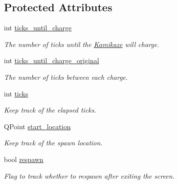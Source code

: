 \subsection*{Protected Attributes}
\begin{DoxyCompactItemize}
\item 
\hypertarget{classKamikaze_a1daf6e11e123fb83099dca5832daf9ce}{
int \hyperlink{classKamikaze_a1daf6e11e123fb83099dca5832daf9ce}{ticks\_\-until\_\-charge}}
\label{classKamikaze_a1daf6e11e123fb83099dca5832daf9ce}

\begin{DoxyCompactList}\small\item\em The number of ticks until the \hyperlink{classKamikaze}{Kamikaze} will charge. \end{DoxyCompactList}\item 
\hypertarget{classKamikaze_acaf86edd63975e32ecad37cbe0dea4e1}{
int \hyperlink{classKamikaze_acaf86edd63975e32ecad37cbe0dea4e1}{ticks\_\-until\_\-charge\_\-original}}
\label{classKamikaze_acaf86edd63975e32ecad37cbe0dea4e1}

\begin{DoxyCompactList}\small\item\em The number of ticks between each charge. \end{DoxyCompactList}\item 
\hypertarget{classKamikaze_ac29580b87540ba54da01d88c136d12ba}{
int \hyperlink{classKamikaze_ac29580b87540ba54da01d88c136d12ba}{ticks}}
\label{classKamikaze_ac29580b87540ba54da01d88c136d12ba}

\begin{DoxyCompactList}\small\item\em Keep track of the elapsed ticks. \end{DoxyCompactList}\item 
\hypertarget{classKamikaze_ae4257ec55e8a232fa4f16802ce5f5361}{
QPoint \hyperlink{classKamikaze_ae4257ec55e8a232fa4f16802ce5f5361}{start\_\-location}}
\label{classKamikaze_ae4257ec55e8a232fa4f16802ce5f5361}

\begin{DoxyCompactList}\small\item\em Keep track of the spawn location. \end{DoxyCompactList}\item 
\hypertarget{classKamikaze_aeb07c995727bc870195efb244c584239}{
bool \hyperlink{classKamikaze_aeb07c995727bc870195efb244c584239}{respawn}}
\label{classKamikaze_aeb07c995727bc870195efb244c584239}

\begin{DoxyCompactList}\small\item\em Flag to track whether to respawn after exiting the screen. \end{DoxyCompactList}\end{DoxyCompactItemize}


